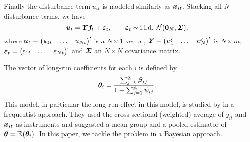 Finally the disturbance term $u_{it}$ is modeled similarly as $\bm x_{it}$. Stacking all $N$ disturbance terms, we have
\begin{equation}
	\bm u_t=\bm \varUpsilon\bm f_t+\bm {\varepsilon}_t,\qquad
	\bm {\varepsilon}_t\sim\text{i.i.d.}~\mathcal{N}(\boldsymbol{0}_{N},\bm \varSigma),
\end{equation}
where
$\bm u_t=	
	\begin{pmatrix}
		u_{1t}&\dots&u_{Nt}
	\end{pmatrix}'$ is a $N\times1$ vector,
$\bm \varUpsilon=
	\begin{pmatrix}
		\bm \upsilon_1'&\dots&\bm \upsilon_N'
	\end{pmatrix}'$ is $N\times m$,
$\bm {\varepsilon}_t=	
	\begin{pmatrix}
		\varepsilon_{1t}&\dots&\varepsilon_{Nt}
	\end{pmatrix}'$ and $\bm \varSigma$ an $N\times N$ covariance matrix.
	
The vector of long-run coefficients for each $i$ is defined by
\begin{equation}
	\bm \theta_i=\frac{\sum^{q_i}_{j=0}\bm \beta_{ij}}{1-\sum^{p_i}_{j=1}\psi_{ij}}.
\end{equation}
This model, in particular the long-run effect in this model, is studied by \cite{CCE15} in a frequentist approach. They used the cross-sectional (weighted) average of $y_{it}$ and $\bm x_{it}$ as instruments and suggested a mean-group and a pooled estimator of $\bm \theta=\mathbb{E}\left(\bm \theta_i\right)$. In this paper, we tackle the problem in a Bayesian approach.